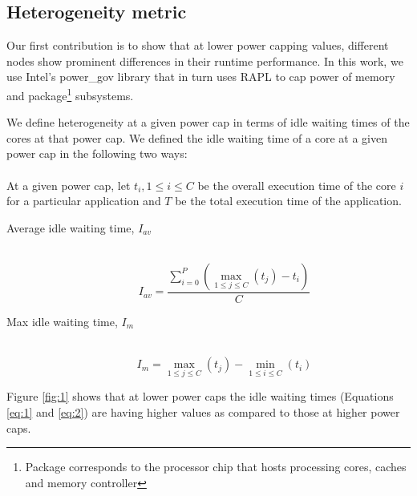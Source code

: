 \subsection{Heterogeneity metric}
Our first contribution is to show that at lower power capping values, different
nodes show prominent differences in their runtime performance.  In this work,
      we use Intel's power\_gov library\cite{power_gov} that in turn uses RAPL
      \cite{rapl} to cap power of memory and package\footnote{Package
        corresponds to the processor chip that hosts processing cores, caches
          and memory controller} subsystems.


We define heterogeneity at a given power cap in terms of idle waiting times of
the cores at that power cap.  We defined the idle waiting time of a core at a
given power cap in the following two ways: 
\\ 
\\
\noindent At a given power cap, let  $t_{i}, 1\leq i \leq C$  be the overall
execution time of the core $i$ for a particular application and $T$ be the
total execution time of the application.  

\begin{description}
  \item[Average idle waiting time, $I_{av}$] \hfill \\ 
    \begin{equation} \label{eq:1}
      I_{av} = \frac{\displaystyle\sum\limits_{i=0}^P (\displaystyle\max_{1\leq j \leq C} ( t_{j} ) - t_{i})}{C}
    \end{equation}
  \item[Max idle waiting time, $I_{m}$] \hfill \\
    \begin{equation} \label{eq:2}
      I_{m} = \displaystyle\max_{1\leq j \leq C} ( t_{j} ) -  \displaystyle\min_{1\leq i \leq C} ( t_{i} )
    \end{equation}
\end{description}

Figure \ref{fig:1} shows that at lower power caps the
idle waiting times (Equations \eqref{eq:1} and \eqref{eq:2}) are having higher values as
compared to those at higher power caps. 

